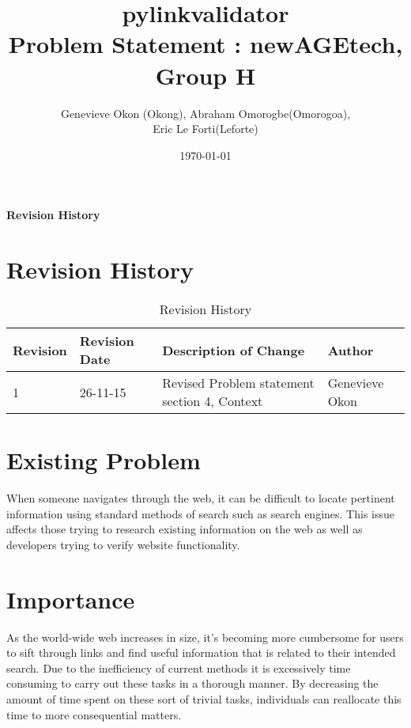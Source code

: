 \documentclass[12pt]{article}
\begin{document}
\title{pylinkvalidator \\
 Problem Statement : newAGEtech, Group H }
\author{Genevieve Okon (Okong), Abraham Omorogbe(Omorogoa),\\
 Eric Le Forti(Leforte)}
\date{\today}
\maketitle



\tableofcontents
\listoffigures
\listoftables

\textbf{Revision History} \\ \normalsize
\pagebreak

\section{Revision History}
\begin{table}[h!]
	\begin{tabular}{| p{5cm} | p{5cm} | p{5cm} |p{5cm} |}    \hline
Revision  &Revision Date &Description of Change &Author\\ \hline
1& 26-11-15& Revised Problem statement section 4, Context&Genevieve Okon\\ \hline
       \end{tabular}
       
       \caption{Revision History}
       \label{table:Revision History}
\end{table}



	
\section{Existing Problem}

When someone navigates through the web, it can be difficult to locate pertinent information using standard methods of search such as search engines. This issue affects those trying to research existing information on the web as well as developers trying to verify website functionality.\newline

\section{Importance}

As the world-wide web increases in size, it's becoming more cumbersome for users to sift through links and find useful information that is related to their intended search. Due to the inefficiency of current methods it is excessively time consuming to carry out these tasks in a thorough manner. By decreasing the amount of time spent on these sort of trivial tasks, individuals can reallocate this time to more consequential matters. \newline
\end{document}
